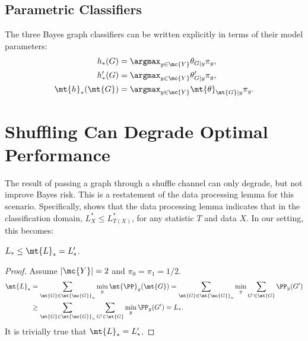 \documentclass[10pt,journal,cspaper,compsoc]{IEEEtran}
\begin{document}
\subsection{Parametric Classifiers} %
\label{sub:parametric_classifiers}


The three Bayes graph classifiers can be written explicitly in terms of their model parameters:
\begin{align}
	h_*(G) &= \argmax_{y \in \mc{Y}} \theta_{G|y}\pi_y, \\
	h_*'(G) &= \argmax_{y \in \mc{Y}} \theta_{G|y}' \pi_y, \\
	\mt{h}_*(\mt{G}) &= \argmax_{y \in \mc{Y}}  \mt{\theta}_{\mt{G}|y}\pi_y. \label{eq:unbayes2}
\end{align}




\section{Shuffling Can Degrade Optimal Performance} %
\label{sec:shuffle}





The result of passing a graph through a shuffle channel can only degrade, but not improve Bayes risk.  This is a restatement of the data processing lemma for this scenario. Specifically, \cite{DEV96} shows that the data processing lemma indicates that in the classification domain, $L^*_X \leq L^*_{T(X)}$, for any statistic $T$ and data $X$.  In our setting, this becomes:

\begin{thm} \label{thm:1}
$L_* \leq \mt{L}_*=L_*'$.
\end{thm}

\begin{proof}
	Assume $|\mc{Y}|=2$ and $\pi_0=\pi_1=1/2$.  
\begin{align} \label{eq:thm1}
	\mt{L}_*&=\sum_{\mt{G} \in \mt{\mc{G}}_n} \min_y \mt{\PP}_{y}(\mt{G})
	=\sum_{\mt{G} \in \mt{\mc{G}}_n} \min_y \sum_{G' \in \mt{G}}\PP_y(G')
	\nonumber \\& \geq \sum_{\mt{G} \in \mt{\mc{G}}_n}\sum_{G' \in \mt{G}}\min_y\PP_y(G')=L_*.
\end{align}
It is trivially true that $\mt{L}_*=L_*'$.
\end{proof}
\end{document}
